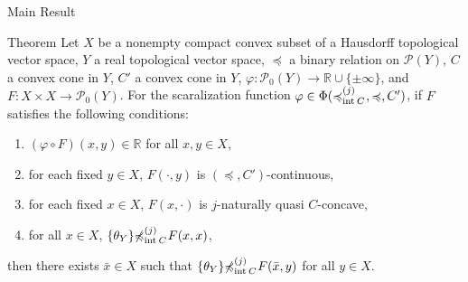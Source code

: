 \documentclass[aspectratio=169, dvipdfmx, 11pt]{beamer}
\newcommand{\RealNumberSet}{\mathbb{R}}
\newcommand{\Interior}[1]{\text{\rm int\:${#1}$}} %
\newcommand{\pow}[1]{\mathcal{P}_{0}(#1)}
\newcommand{\setrel}[2]{\preccurlyeq^{(#1)}_{#2}\!}
\newcommand{\notsetrel}[2]{{\not\preccurlyeq}^{(#1)}_{#2}\!}
\begin{document}
\begin{frame}{Main Result}
  \begin{block}{Theorem}
    Let $X$ be a nonempty compact convex subset of a Hausdorff topological vector space,
    $Y$ a real topological vector space, $\preccurlyeq$ a binary relation on $\mathcal{P}(Y)$,
    $C$ a convex cone in $Y$, $C'$ a convex cone in $Y$,
    $\varphi\colon \pow{Y} \to \RealNumberSet \cup \{\pm \infty\}$,
    and $F\colon X \times X \to \pow{Y}$.
    For the scaralization function $\varphi \in \Phi(\setrel{j}{\Interior{C}}\:, \preccurlyeq, C')$,
    if $F$ satisfies the following conditions:
    \begin{enumerate}
      \item $(\varphi \circ F)(x,y) \in \RealNumberSet$ for all $x,y \in X$,
      \item for each fixed $y \in X$, $F(\cdot,y)$ is $(\preccurlyeq, C')$-continuous,
      \item for each fixed $x \in X$, $F(x,\cdot)$ is $j$-naturally quasi $C$-concave,
      \item for all $x \in X$, $\{\theta_Y\} \notsetrel{j}{\Interior{C}}\: F(x,x) $,
    \end{enumerate}
    then there exists $\bar{x} \in X$ such that $\{\theta_Y\} \notsetrel{j}{\Interior{C}}\: F(\bar{x},y)$
    for all $y \in X$.
  \end{block}
\end{frame}

\end{document}
